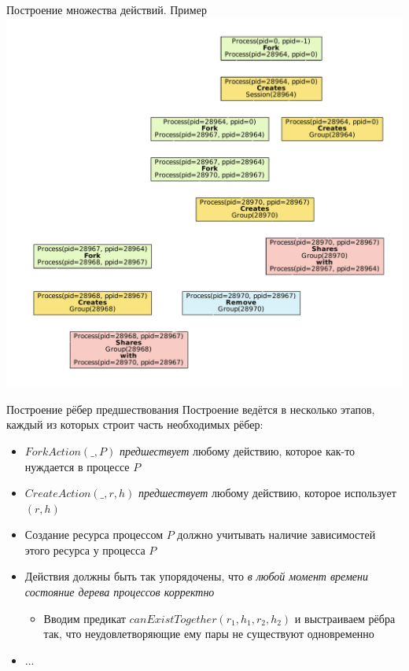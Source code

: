\begin{frame}{Построение множества действий. Пример}
\centering
\includegraphics[scale=0.3]{fig/simpleGroupsGraph.pdf}
\end{frame}


\begin{frame}{Построение рёбер предшествования}
Построение ведётся в несколько этапов, каждый из которых строит часть необходимых рёбер:
\begin{itemize}
	\item $ForkAction(\_, P)$ \emph{предшествует} любому действию, которое как-то нуждается в процессе $P$
	\item $CreateAction(\_, r, h)$ \emph{предшествует} любому действию, которое использует $(r, h)$ 
	\item Создание ресурса процессом $P$ должно \alert{учитывать наличие зависимостей} этого ресурса у процесса $P$
	\item Действия должны быть так упорядочены, что \emph{в любой момент времени состояние дерева процессов корректно}
		\begin{itemize}
			\item Вводим предикат \alert{$canExistTogether(r_1, h_1, r_2, h_2)$} и выстраиваем рёбра так, что неудовлетворяющие ему пары не существуют одновременно
		\end{itemize}
	\item ...
\end{itemize}
\end{frame}

